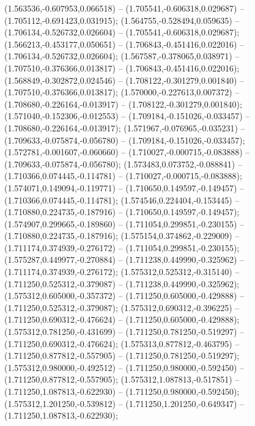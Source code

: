  (1.563536,-0.607953,0.066518) -- (1.705541,-0.606318,0.029687) -- (1.705112,-0.691423,0.031915);
 (1.564755,-0.528494,0.059635) -- (1.706134,-0.526732,0.026604) -- (1.705541,-0.606318,0.029687);
 (1.566213,-0.453177,0.050651) -- (1.706843,-0.451416,0.022016) -- (1.706134,-0.526732,0.026604);
 (1.567587,-0.378065,0.038971) -- (1.707510,-0.376366,0.013817) -- (1.706843,-0.451416,0.022016);
 (1.568849,-0.302872,0.024546) -- (1.708122,-0.301279,0.001840) -- (1.707510,-0.376366,0.013817);
 (1.570000,-0.227613,0.007372) -- (1.708680,-0.226164,-0.013917) -- (1.708122,-0.301279,0.001840);
 (1.571040,-0.152306,-0.012553) -- (1.709184,-0.151026,-0.033457) -- (1.708680,-0.226164,-0.013917);
 (1.571967,-0.076965,-0.035231) -- (1.709633,-0.075874,-0.056780) -- (1.709184,-0.151026,-0.033457);
 (1.572781,-0.001607,-0.060660) -- (1.710027,-0.000715,-0.083888) -- (1.709633,-0.075874,-0.056780);
 (1.573483,0.073752,-0.088841) -- (1.710366,0.074445,-0.114781) -- (1.710027,-0.000715,-0.083888);
 (1.574071,0.149094,-0.119771) -- (1.710650,0.149597,-0.149457) -- (1.710366,0.074445,-0.114781);
 (1.574546,0.224404,-0.153445) -- (1.710880,0.224735,-0.187916) -- (1.710650,0.149597,-0.149457);
 (1.574907,0.299665,-0.189860) -- (1.711054,0.299851,-0.230155) -- (1.710880,0.224735,-0.187916);
 (1.575154,0.374862,-0.229009) -- (1.711174,0.374939,-0.276172) -- (1.711054,0.299851,-0.230155);
 (1.575287,0.449977,-0.270884) -- (1.711238,0.449990,-0.325962) -- (1.711174,0.374939,-0.276172);
 (1.575312,0.525312,-0.315140) -- (1.711250,0.525312,-0.379087) -- (1.711238,0.449990,-0.325962);
 (1.575312,0.605000,-0.357372) -- (1.711250,0.605000,-0.429888) -- (1.711250,0.525312,-0.379087);
 (1.575312,0.690312,-0.396225) -- (1.711250,0.690312,-0.476624) -- (1.711250,0.605000,-0.429888);
 (1.575312,0.781250,-0.431699) -- (1.711250,0.781250,-0.519297) -- (1.711250,0.690312,-0.476624);
 (1.575313,0.877812,-0.463795) -- (1.711250,0.877812,-0.557905) -- (1.711250,0.781250,-0.519297);
 (1.575312,0.980000,-0.492512) -- (1.711250,0.980000,-0.592450) -- (1.711250,0.877812,-0.557905);
 (1.575312,1.087813,-0.517851) -- (1.711250,1.087813,-0.622930) -- (1.711250,0.980000,-0.592450);
 (1.575312,1.201250,-0.539812) -- (1.711250,1.201250,-0.649347) -- (1.711250,1.087813,-0.622930);
